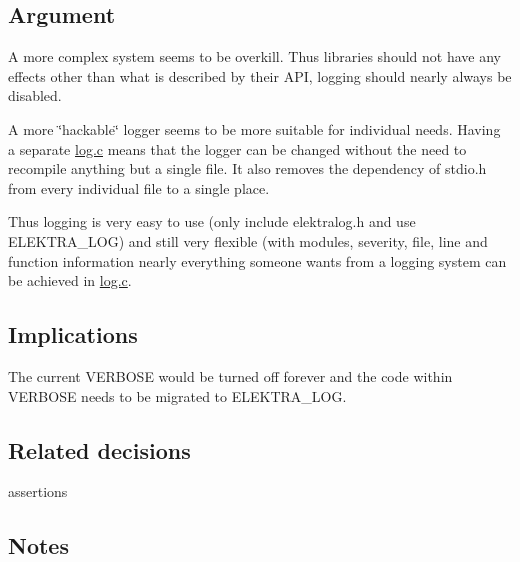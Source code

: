 \subsection*{Argument}

A more complex system seems to be overkill. Thus libraries should not have any effects other than what is described by their A\+PI, logging should nearly always be disabled.

A more \char`\"{}hackable\char`\"{} logger seems to be more suitable for individual needs. Having a separate {\ttfamily \hyperlink{log_8c}{log.\+c}} means that the logger can be changed without the need to recompile anything but a single file. It also removes the dependency of {\ttfamily stdio.\+h} from every individual file to a single place.

Thus logging is very easy to use (only include {\ttfamily elektralog.\+h} and use {\ttfamily E\+L\+E\+K\+T\+R\+A\+\_\+\+L\+OG}) and still very flexible (with modules, severity, file, line and function information nearly everything someone wants from a logging system can be achieved in {\ttfamily \hyperlink{log_8c}{log.\+c}}.

\subsection*{Implications}

The current V\+E\+R\+B\+O\+SE would be turned off forever and the code within V\+E\+R\+B\+O\+SE needs to be migrated to {\ttfamily E\+L\+E\+K\+T\+R\+A\+\_\+\+L\+OG}.

\subsection*{Related decisions}


\begin{DoxyItemize}
\item assertions
\end{DoxyItemize}

\subsection*{Notes}